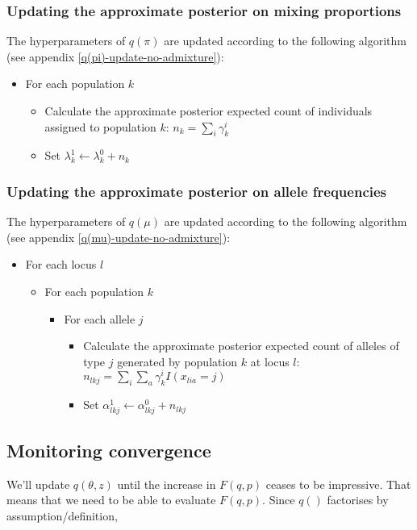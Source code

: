 \documentclass[12pt,a4paper,reqno]{article}
\newcommand{\(}{\left(}
\newcommand{\)}{\right)}
\newcommand{\|}{\arrowvert}
\begin{document}
\subsubsection{Updating the approximate posterior on mixing proportions}
The hyperparameters of $q(\pi)$ are updated according to the following algorithm (see appendix \ref{q(pi)-update-no-admixture}):
\begin{itemize}
\item For each population $k$
  \begin{itemize}
  \item Calculate the approximate posterior expected count of individuals assigned to population $k$: $n_{k} = \sum_{i}\gamma^{i}_{k}$
  \item Set $\lambda^{1}_{k} \leftarrow \lambda^{0}_{k} + n_{k}$
  \end{itemize}

\end{itemize}

\subsubsection{Updating the approximate posterior on allele frequencies}
The hyperparameters of $q(\mu)$ are updated according to the following algorithm (see appendix \ref{q(mu)-update-no-admixture}):

\begin{itemize}
\item For each locus $l$
  \begin{itemize}
  \item For each population $k$
    \begin{itemize}
    \item For each allele $j$
      \begin{itemize}
      \item Calculate the approximate posterior expected count of alleles of type $j$ generated by population $k$ at locus $l$: $n_{lkj} = \sum_{i} \sum_{a}\gamma^{i}_{k}I(x_{lia}=j)$
      \item Set $\alpha^{1}_{lkj} \leftarrow \alpha^{0}_{lkj} + n_{lkj}$
      \end{itemize}
    \end{itemize}
  \end{itemize}
\end{itemize}

\subsection{Monitoring convergence}
We'll update $q(\theta,z)$ until the increase in $F(q,p)$ ceases to be impressive. That means that we need to be able to evaluate $F(q,p)$. Since $q()$ factorises by assumption/definition,
\end{document}
